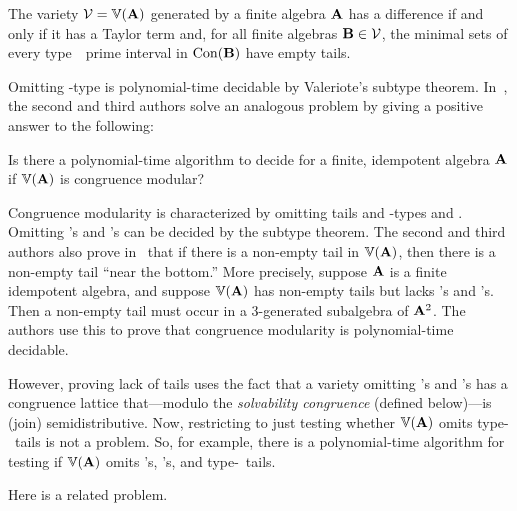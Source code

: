 \begin{theorem}
\label{thm:KearnesThm}
The variety $\mathcal{V} = \operatorname{\mathbb{V}}(\mathbf{A})$ generated by a 
finite algebra $\mathbf{A}$ has a difference  if and only if
it has a Taylor term and, for all finite algebras 
$\mathbf{B} \in \mathcal{V}$,
the minimal sets of every type~\atyp\ prime interval in
$\operatorname{Con}(\mathbf{B})$ have empty tails.
\end{theorem}



Omitting \tct-type \utyp is polynomial-time decidable by Valeriote's subtype theorem. 
In~\cite{Freese:2009}, the second and third authors solve an 
analogous problem by giving a positive answer to the following:
\begin{prob}
  \label{prob:2}
  Is there a polynomial-time algorithm to decide for a finite,
  idempotent algebra $\mathbf{A}$ if $\operatorname{\mathbb{V}}(\mathbf{A})$ is congruence modular?
\end{prob}

Congruence modularity is characterized by omitting tails and 
\tct-types \utyp and \styp.
Omitting \utyp's and \styp's can be decided by the subtype theorem.
The second and third authors also prove in~\cite{Freese:2009} that
if there is a 
non-empty 
tail in $\operatorname{\mathbb{V}}(\mathbf{A})$, then there is a 
non-empty
tail ``near the bottom.''
More precisely, suppose $\mathbf{A}$ is a finite idempotent algebra, and suppose
$\operatorname{\mathbb{V}}(\mathbf{A})$ has non-empty tails but lacks \utyp's and \styp's.
Then a non-empty tail must occur in a 3-generated subalgebra of $\mathbf{A}^2$.
The authors use this to prove that congruence modularity is polynomial-time decidable.

However, proving lack of tails uses the fact that a variety omitting
\utyp's and \styp's has a congruence lattice that---modulo 
the {\it solvability congruence} (defined below)---is (join) semidistributive.
Now, restricting to just testing whether $\operatorname{\mathbb{V}}(\mathbf{A})$ omits 
type-\atyp\ tails is not a problem. So, for example, there is a 
polynomial-time algorithm for testing if
$\operatorname{\mathbb{V}}(\mathbf{A})$ omits \utyp's, \styp's, and type-\atyp\ tails.  

Here is a related problem.

